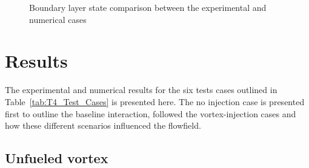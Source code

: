 \documentclass{AIAA}
\begin{document}
\begin{figure}[!h]
\center
{}
\caption{Boundary layer state comparison between the experimental and numerical cases}
\label{fig:Num_Exp_BLcompar}
\end{figure} 



\section{Results}

The experimental and numerical results for the six tests cases outlined in Table~\ref{tab:T4_Test_Cases} is presented here.
The no injection case is presented first to outline the baseline interaction, followed the vortex-injection cases and how these different scenarios influenced the flowfield.

\subsection{Unfueled vortex}
\end{document}
